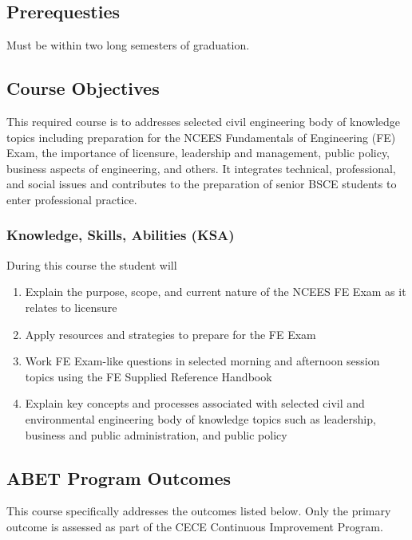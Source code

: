 \documentclass[12pt]{article}
\begin{document}
\subsection*{{Prerequesties}}
Must be within two long semesters of graduation.
\subsection*{{Course Objectives}}
This required course is to addresses selected civil engineering body of knowledge topics 
including preparation for the NCEES Fundamentals of Engineering (FE) Exam, 
the importance of licensure, leadership and management, public policy, 
business aspects of engineering, and others. It integrates technical, professional, and social
issues and contributes to the preparation of senior BSCE students to enter professional practice.
\subsubsection*{{Knowledge, Skills, Abilities (KSA)}}
During this course the student will
\begin{enumerate}
\item Explain the purpose, scope, and current nature of the NCEES FE Exam as it relates
to licensure
\item Apply resources and strategies to prepare for the FE Exam
\item Work FE Exam-like questions in selected morning and afternoon session topics
using the FE Supplied Reference Handbook
\item Explain key concepts and processes associated with selected civil and
environmental engineering body of knowledge topics such as leadership, business
and public administration, and public policy
\end{enumerate}

\subsection*{{ABET Program Outcomes}}
This course specifically addresses the outcomes listed below.  Only the primary outcome is assessed as part of the CECE Continuous Improvement Program.
\end{document}
